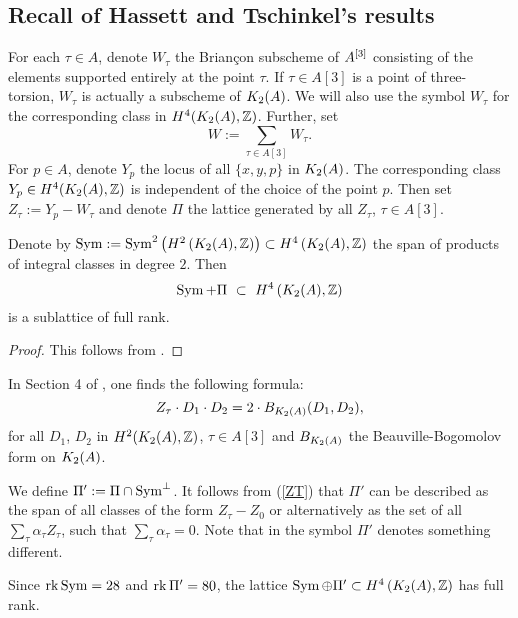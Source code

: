\subsection{Recall of Hassett and Tschinkel's results}\label{HassetTschinkelSection} \label{Middle}
\begin{notation}\label{TheZs}
For each $\tau \in A$, denote $W_\tau$ the Brian\c con subscheme of $A^{[3]}$ consisting of the elements supported entirely at the point $\tau$. If $\tau\in A[3]$ is a point of three-torsion, $W_\tau$ is actually a subscheme of $K_{ 2 }( A )$. We will also use the symbol $W_\tau$ for the corresponding class in $H^4(K_{ 2 }( A ),\mathbb{Z})$. Further, set 
$$
W := \sum_{\tau\in A[3]} W_\tau.
$$
For $p\in A$, denote $Y_p$ the locus of all $\{x,y,p\}$ in $K_{ 2 }( A )$. The corresponding class $Y_p \in H^4(K_{ 2 }( A ),\mathbb{Z})$ is independent of the choice of the point $p$. Then set $Z_\tau := Y_p - W_\tau$ and denote $\Pi$ the lattice generated by all $Z_\tau$, $\tau \in A[3]$.
\end{notation}
\begin{proposition}
Denote by $\operatorname{Sym} := \operatorname{Sym}^2\left(H^2\left(K_{ 2 }( A ),\mathbb{Z}\right)\right) \subset H^4\left(K_{ 2 }( A ),\mathbb{Z}\right) $ the span of products of integral classes in degree $2$.
Then 
$$
\Sym+\Pi \ \subset\  H^4\left(\X,\Z\right)
$$
is a sublattice  of full rank.  
\end{proposition}
\begin{proof}
This follows from \cite[Proposition 4.3]{Hassett}.
\end{proof}

In Section 4 of \cite{Hassett}, one finds the following formula:
\begin{equation}
Z_{\tau}\cdot D_{1}\cdot D_{2}=2\cdot B_{K_{ 2 }( A )}(D_{1},D_{2}),
\label{ZT}
\end{equation}
for all $D_{1}$, $D_{2}$ in $H^{2}(K_{ 2 }( A ),\mathbb{Z})$, $\tau\in A[3]$ and $B_{K_{ 2 }( A )}$ the Beauville-Bogomolov form on $K_{ 2 }( A )$.

\begin{definition}\label{defiPi}
We define $\Pi' := \Pi \cap \operatorname{Sym}^{\perp}$. It follows from (\ref{ZT}) that $\Pi'$ can be described as the span of all classes of the form $Z_\tau -Z_0$ or alternatively as the set of all
$
\sum_\tau \alpha_\tau Z_\tau $, such that $ \sum_\tau \alpha_\tau =0$.
Note that in \cite{Hassett} the symbol $\Pi'$ denotes something different.
\end{definition}
\begin{remark}
Since $\operatorname{rk} \operatorname{Sym} = 28$ and $\operatorname{rk} \Pi' = 80$, the lattice $\operatorname{Sym}\oplus\Pi'\subset H^4\left(K_{ 2 }( A ),\mathbb{Z}\right)$ has full rank.
\end{remark}

